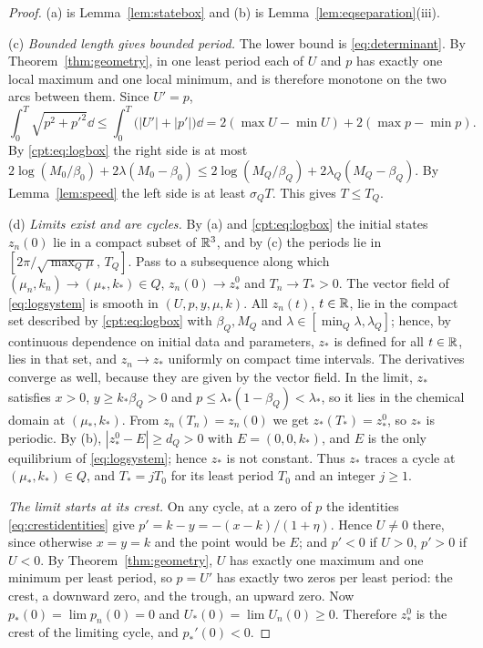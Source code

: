 \begin{proof}
(a) is Lemma~\ref{lem:statebox} and (b) is Lemma~\ref{lem:eqseparation}(iii).

(c) \emph{Bounded length gives bounded period.} The lower bound is \eqref{eq:determinant}. By Theorem~\ref{thm:geometry}, in one least period each of $U$ and $p$ has exactly one local maximum and one local minimum, and is therefore monotone on the two arcs between them. Since $U'=p$,
\[
\int_0^T\sqrt{p^2+p'^2}\dd\le\int_0^T\bigl(|U'|+|p'|\bigr)\dd
=2(\max U-\min U)+2(\max p-\min p).
\]
By \eqref{cpt:eq:logbox} the right side is at most $2\log(M_0/\beta_0)+2\lambda(M_0-\beta_0)\le2\log(M_Q/\beta_Q)+2\lambda_Q(M_Q-\beta_Q)$. By Lemma~\ref{lem:speed} the left side is at least $\sigma_QT$. This gives $T\le T_Q$.

(d) \emph{Limits exist and are cycles.} By (a) and \eqref{cpt:eq:logbox} the initial states $z_n(0)$ lie in a compact subset of $\mathbb R^3$, and by (c) the periods lie in $[2\pi/\sqrt{\max_Q\mu},\,T_Q]$. Pass to a subsequence along which $(\mu_n,k_n)\to(\mu_*,k_*)\in Q$, $z_n(0)\to z_*^0$ and $T_n\to T_*>0$. The vector field of \eqref{eq:logsystem} is smooth in $(U,p,y,\mu,k)$. All $z_n(t)$, $t\in\mathbb R$, lie in the compact set described by \eqref{cpt:eq:logbox} with $\beta_Q,M_Q$ and $\lambda\in[\min_Q\lambda,\lambda_Q]$; hence, by continuous dependence on initial data and parameters, $z_*$ is defined for all $t\in\mathbb R$, lies in that set, and $z_n\to z_*$ uniformly on compact time intervals. The derivatives converge as well, because they are given by the vector field. In the limit, $z_*$ satisfies $x>0$, $y\ge k_*\beta_Q>0$ and $p\le\lambda_*(1-\beta_Q)<\lambda_*$, so it lies in the chemical domain at $(\mu_*,k_*)$. From $z_n(T_n)=z_n(0)$ we get $z_*(T_*)=z_*^0$, so $z_*$ is periodic. By (b), $|z_*^0-E|\ge d_Q>0$ with $E=(0,0,k_*)$, and $E$ is the only equilibrium of \eqref{eq:logsystem}; hence $z_*$ is not constant. Thus $z_*$ traces a cycle at $(\mu_*,k_*)\in Q$, and $T_*=jT_0$ for its least period $T_0$ and an integer $j\ge1$.

\emph{The limit starts at its crest.} On any cycle, at a zero of $p$ the identities \eqref{eq:crestidentities} give $p'=k-y=-(x-k)/(1+\eta)$. Hence $U\ne0$ there, since otherwise $x=y=k$ and the point would be $E$; and $p'<0$ if $U>0$, $p'>0$ if $U<0$. By Theorem~\ref{thm:geometry}, $U$ has exactly one maximum and one minimum per least period, so $p=U'$ has exactly two zeros per least period: the crest, a downward zero, and the trough, an upward zero. Now $p_*(0)=\lim p_n(0)=0$ and $U_*(0)=\lim U_n(0)\ge0$. Therefore $z_*^0$ is the crest of the limiting cycle, and $p_*'(0)<0$.


\end{proof}
